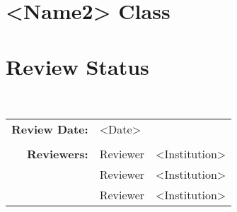 \documentclass[]{article}
\begin{document}
\section{<Name2> Class}


\section{Review Status}

 \\

\begin{tabular}{r p{1.3in} p{2in}}
{\bf Review Date:} & <Date> \\ \\
{\bf Reviewers:}   & Reviewer           & <Institution> \\
                   & Reviewer           & <Institution> \\
                   & Reviewer           & <Institution>
\end{tabular}



 

\end{document}
